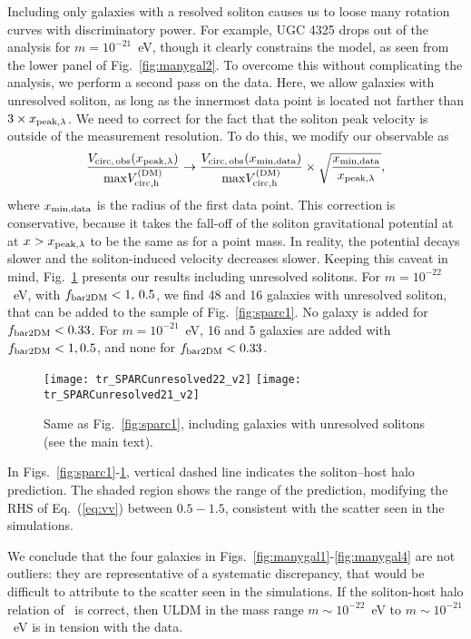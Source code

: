 \documentclass[aps,prd,floats,superscriptaddress,showpacs,nofootinbib,twocolumn,preprintnumbers]{revtex4-1}%
\def\be{\begin{eqnarray}}
\def\ee{\end{eqnarray}}
\def\no{\nonumber}
\begin{document}
Including only galaxies with a resolved soliton causes us to loose
many rotation curves with discriminatory power. For example,
UGC 4325 drops out of the analysis for $m=10^{-21}$~eV, though it
clearly constrains the model, as seen from the lower panel
of Fig.~\ref{fig:manygal2}.
To
overcome this without complicating the analysis, we
perform a second 
pass on the data. Here, we allow galaxies with unresolved soliton, as
long as the innermost data point is located not farther than $3\times
x_{\rm peak,\lambda}$. We need to correct for the fact that the
soliton peak velocity is outside of the measurement resolution. To do
this, we modify our observable as 
%
\be\frac{V_{\rm circ,\,obs}(x_{\rm peak,\lambda})}{{\rm max} V_{\rm circ,h}^{\rm (DM)}}\to \frac{V_{\rm circ,\,obs}(x_{\rm min,data})}{{\rm max} V_{\rm circ,h}^{\rm (DM)}}\times\sqrt{\frac{x_{\rm min,data}}{x_{\rm peak,\lambda}}},\no\\\ee
%
where $x_{\rm min,data}$ is the radius of the first data point. This
correction is conservative, because it takes the fall-off of the
soliton gravitational potential at
at $x>x_{\rm peak,\lambda}$ to be the same as for a point mass. 
In reality, the potential decays slower and
the soliton-induced velocity decreases slower. Keeping this caveat in
mind, Fig.~\ref{fig:sparc2} presents our results including unresolved
solitons. 
For $m=10^{-22}$~eV, with $f_{\rm bar2DM}<1,\,0.5$, we find 48 and 16 galaxies with unresolved soliton, that can be added to the sample of Fig.~\ref{fig:sparc1}. No galaxy is added for $f_{\rm bar2DM}<0.33$. For $m=10^{-21}$~eV, 16 and 5 galaxies are added with $f_{\rm bar2DM}<1, 0.5$, and none for $f_{\rm bar2DM}<0.33$.
%
\begin{figure}[hbp!]
\centering
\texttt{[image: tr\_SPARCunresolved22\_v2]}
\texttt{[image: tr\_SPARCunresolved21\_v2]}
\caption{Same as Fig.~\ref{fig:sparc1}, including galaxies with 
unresolved solitons (see the main text).
}\label{fig:sparc2}
\end{figure}
%

In Figs.~\ref{fig:sparc1}-\ref{fig:sparc2}, vertical dashed line indicates the soliton--host halo prediction. The shaded region shows the range of the prediction, modifying the RHS of Eq.~(\ref{eq:vv}) between $0.5-1.5$, consistent with the scatter seen in the simulations. 

We conclude that the four galaxies in
Figs.~\ref{fig:manygal1}-\ref{fig:manygal4} are not outliers: they are
representative of a systematic discrepancy, that would be difficult to
attribute to the scatter seen in the simulations.  
If the soliton-host halo relation
of~\cite{Schive:2014hza,Schive:2014dra} is correct, then ULDM in the
mass range $m\sim10^{-22}$~eV to $m\sim10^{-21}$~eV is in tension with the data.  
\end{document}

